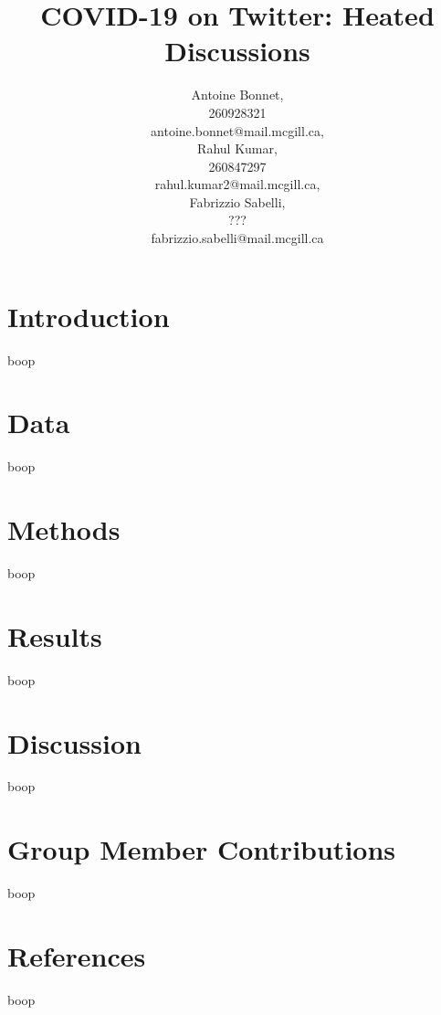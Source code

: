 \documentclass[letterpaper]{article} %
\title{COVID-19 on Twitter: Heated Discussions}
\author{Antoine Bonnet, \\
  260928321 \\
antoine.bonnet@mail.mcgill.ca,
\\[3ex]
Rahul Kumar,\\
260847297\\
rahul.kumar2@mail.mcgill.ca, 
\\[3ex]
Fabrizzio Sabelli,\\
???\\
fabrizzio.sabelli@mail.mcgill.ca}
\begin{document}
\maketitle

\section{Introduction}
boop

\section{Data}
boop

\section{Methods}
boop


\section{Results}
boop

\section{Discussion}
boop

\section{Group Member Contributions}
boop

\section{References}
boop
\end{document}
